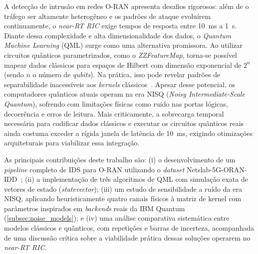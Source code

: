 \documentclass[12pt]{article}
\begin{document}
%

A detecção de intrusão em redes O-RAN apresenta desafios rigorosos: além de o tráfego ser altamente heterogêneo e os padrões de ataque evoluírem continuamente, o \textit{near-RT RIC} exige tempos de resposta entre 10~ms a 1~s. Diante dessa complexidade e alta dimensionalidade dos dados, o \textit{Quantum Machine Learning} (QML) surge como uma alternativa promissora. Ao utilizar circuitos quânticos parametrizados, como o \textit{ZZFeatureMap}, torna-se possível mapear dados clássicos para espaços de Hilbert com dimensão exponencial de $2^n$ (sendo $n$ o número de \textit{qubits}). Na prática, isso pode revelar padrões de separabilidade inacessíveis aos \textit{kernels} clássicos~\cite{havlicek2019}. Apesar desse potencial, os computadores quânticos atuais operam na era NISQ (\textit{Noisy Intermediate-Scale Quantum}), sofrendo com limitações físicas como ruído nas portas lógicas, decoerência e erros de leitura. Mais criticamente, a sobrecarga temporal necessária para codificar dados clássicos e executar os circuitos quânticos reais ainda costuma exceder a rígida janela de latência de 10~ms, exigindo otimizações arquiteturais para viabilizar essa integração.


As principais contribuições deste trabalho são: (i) o desenvolvimento de um \textit{pipeline} completo de IDS para O-RAN utilizando o \textit{dataset} Netslab-5G-ORAN-IDD~\cite{nidd2022}; (ii) a implementação de três algoritmos de QML com simulação exata de vetores de estado (\textit{statevector}); (iii) um estudo de sensibilidade a ruído da era NISQ, aplicando heuristicamente quatro canais físicos à matriz de kernel com parâmetros inspirados em \textit{backends} reais da IBM Quantum (\autoref{subsec:noise_models}); e (iv) uma análise comparativa sistemática entre modelos clássicos e quânticos, com repetições e barras de incerteza, acompanhada de uma discussão crítica sobre a viabilidade prática dessas soluções operarem no \textit{near-RT RIC}.
\end{document}
